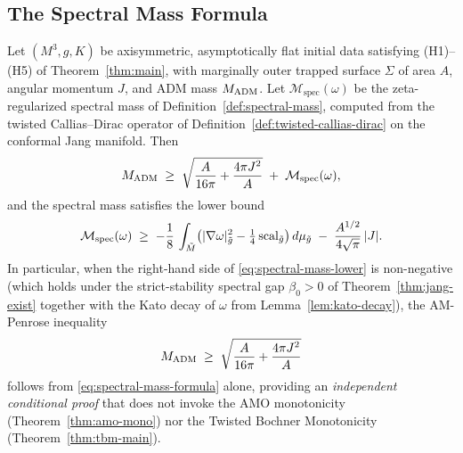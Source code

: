 \subsection{The Spectral Mass Formula}

\begin{theorem}\label{thm:spectral-mass-formula}
Let $(M^3,g,K)$ be axisymmetric, asymptotically flat initial data satisfying (H1)--(H5) of Theorem~\ref{thm:main}, with marginally outer trapped surface $\Sigma$ of area $A$, angular momentum $J$, and ADM mass $M_{\mathrm{ADM}}$. Let $\mathcal{M}_{\mathrm{spec}}(\omega)$ be the zeta-regularized spectral mass of Definition~\ref{def:spectral-mass}, computed from the twisted Callias--Dirac operator of Definition~\ref{def:twisted-callias-dirac} on the conformal Jang manifold. Then
\begin{equation}\label{eq:spectral-mass-formula}
M_{\mathrm{ADM}} \;\geq\; \sqrt{\dfrac{A}{16\pi} + \dfrac{4\pi J^2}{A}} \;+\; \mathcal{M}_{\mathrm{spec}}(\omega),
\end{equation}
and the spectral mass satisfies the lower bound
\begin{equation}\label{eq:spectral-mass-lower}
\mathcal{M}_{\mathrm{spec}}(\omega) \;\geq\; -\dfrac{1}{8}\,\int_{\tilde{M}} \bigl(|\nabla\omega|^2_{\tilde{g}} - \tfrac{1}{4}\,\mathrm{scal}_{\tilde{g}}\bigr)\,d\mu_{\tilde{g}} \;-\; \dfrac{A^{1/2}}{4\sqrt{\pi}}\,|J|.
\end{equation}
In particular, when the right-hand side of \eqref{eq:spectral-mass-lower} is non-negative (which holds under the strict-stability spectral gap $\beta_0>0$ of Theorem~\ref{thm:jang-exist} together with the Kato decay of $\omega$ from Lemma~\ref{lem:kato-decay}), the AM-Penrose inequality
\begin{equation}\label{eq:ampi-spectral}
M_{\mathrm{ADM}} \;\geq\; \sqrt{\dfrac{A}{16\pi} + \dfrac{4\pi J^2}{A}}
\end{equation}
follows from \eqref{eq:spectral-mass-formula} alone, providing an \emph{independent conditional proof} that does not invoke the AMO monotonicity (Theorem~\ref{thm:amo-mono}) nor the Twisted Bochner Monotonicity (Theorem~\ref{thm:tbm-main}).
\end{theorem}


